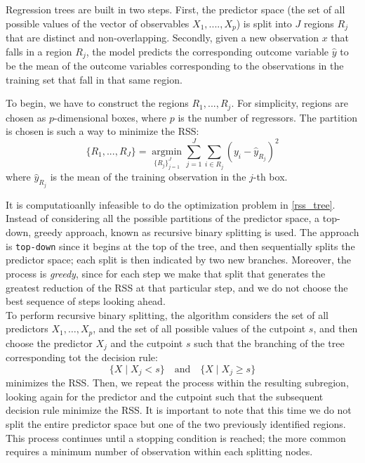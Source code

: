 \documentclass[a4paper,11pt]{article}
\begin{document}
Regression trees are built in two steps.
First, the predictor space (the set of all possible values of the vector of observables $X_1, ...., X_p$) is split into $J$ regions $R_j$ that are distinct and non-overlapping.  Secondly, given a new observation $x$ that falls in a region $R_j$, the model predicts the corresponding outcome variable $\hat{y}$ to be the mean of the outcome variables corresponding to the observations in the training set that fall in that same region.

To begin, we have to construct the regions $R_1,..., R_j$. For simplicity, regions are chosen as $p$-dimensional boxes, where $p$ is the number of regressors. The partition is chosen is such a way to minimize the RSS:  
\begin{equation}
  \{R_1,...,R_J \}=\operatorname*{argmin}_{ \{R_j\}_{j=1}^J}\sum^J_{j=1}\sum_{i\in R_j}\left(y_i-\hat{y}_{R_j}\right)^2
  \label{rss_tree}
\end{equation}
where $\hat{y}_{R_j}$ is the mean of the training observation in the $j$-th box.

It is computatioanlly infeasible to do the optimization problem in \eqref{rss_tree}. Instead of considering all the possible partitions of the predictor space, a top-down, greedy approach, known as recursive binary splitting is used. The approach is \texttt{top-down} since it begins at the top of the tree, and then sequentially splits the predictor space; each split is then indicated by two new branches. Moreover, the process is \textit{greedy}, since for each step we make that split that generates the greatest reduction of the RSS at that particular step, and we do not choose the best sequence of steps looking ahead.
\\To perform recursive binary splitting, the algorithm considers the set of all predictors $X_1, \ldots, X_p$, and the set of all possible values of the cutpoint $s$, and then choose the predictor $X_j$ and the cutpoint $s$ such that the branching of the tree corresponding tot the decision rule:  $$\{X \mid X_j < s\} \quad \text{and} \quad \{X \mid X_j \geq s\}$$ minimizes the RSS. Then, we repeat the process within the resulting subregion, looking again for the predictor and the cutpoint such that the subsequent decision rule minimize the RSS. It is important to note that this time we do not split the entire predictor space but one of the two previously identified regions. This process continues until a stopping condition is reached; the more common requires a minimum number of observation within each splitting nodes.
\end{document}
